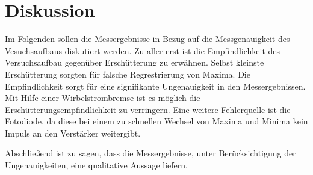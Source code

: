 \section{Diskussion}
Im Folgenden sollen die Messergebnisse in Bezug auf die Messgenauigkeit des
Vesuchsaufbaus diskutiert werden.
Zu aller erst ist die Empfindlichkeit des Versuchsaufbau gegenüber Erschütterung
zu erwähnen. Selbst kleinste Erschütterung sorgten für falsche Regrestrierung von
Maxima. Die Empfindlichkeit sorgt für eine signifikante Ungenauigkeit in den
Messergebnissen. Mit Hilfe einer Wirbelstrombremse ist es möglich die
Erschütterungsempfindlichkeit zu verringern.
Eine weitere Fehlerquelle ist die Fotodiode, da diese bei einem zu schnellen
Wechsel von Maxima und Minima kein Impuls an den Verstärker weitergibt.

Abschließend ist zu sagen, dass die Messergebnisse, unter Berücksichtigung
der Ungenauigkeiten, eine qualitative Aussage liefern.
